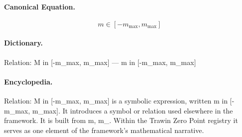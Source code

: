 \paragraph{Canonical Equation.}
\[
m \in [-m_{\max}, m_{\max}]
\]

\paragraph{Dictionary.}
Relation: M in [-m\_max, m\_max] — m in [-m\_max, m\_max]

\paragraph{Encyclopedia.}
Relation: M in [-m\_max, m\_max] is a symbolic expression, written m in [-m\_max, m\_max]. It introduces a symbol or relation used elsewhere in the framework. It is built from m, m\_. Within the Trawin Zero Point registry it serves as one element of the framework's mathematical narrative.
